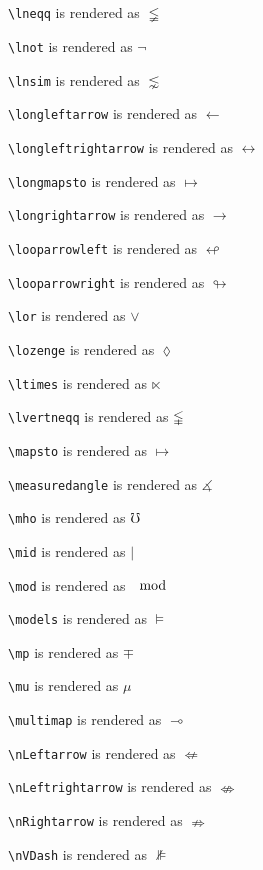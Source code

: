 \texttt{\textbackslash lneqq} is rendered as $\lneqq$

\texttt{\textbackslash lnot} is rendered as $\lnot$

\texttt{\textbackslash lnsim} is rendered as $\lnsim$

\texttt{\textbackslash longleftarrow} is rendered as $\longleftarrow$

\texttt{\textbackslash longleftrightarrow} is rendered as $\longleftrightarrow$

\texttt{\textbackslash longmapsto} is rendered as $\longmapsto$

\texttt{\textbackslash longrightarrow} is rendered as $\longrightarrow$

\texttt{\textbackslash looparrowleft} is rendered as $\looparrowleft$

\texttt{\textbackslash looparrowright} is rendered as $\looparrowright$

\texttt{\textbackslash lor} is rendered as $\lor$

\texttt{\textbackslash lozenge} is rendered as $\lozenge$

\texttt{\textbackslash ltimes} is rendered as $\ltimes$

\texttt{\textbackslash lvertneqq} is rendered as $\lvertneqq$

\texttt{\textbackslash mapsto} is rendered as $\mapsto$

\texttt{\textbackslash measuredangle} is rendered as $\measuredangle$

\texttt{\textbackslash mho} is rendered as $\mho$

\texttt{\textbackslash mid} is rendered as $\mid$

\texttt{\textbackslash mod} is rendered as $\mod$

\texttt{\textbackslash models} is rendered as $\models$

\texttt{\textbackslash mp} is rendered as $\mp$

\texttt{\textbackslash mu} is rendered as $\mu$

\texttt{\textbackslash multimap} is rendered as $\multimap$

\texttt{\textbackslash nLeftarrow} is rendered as $\nLeftarrow$

\texttt{\textbackslash nLeftrightarrow} is rendered as $\nLeftrightarrow$

\texttt{\textbackslash nRightarrow} is rendered as $\nRightarrow$

\texttt{\textbackslash nVDash} is rendered as $\nVDash$

